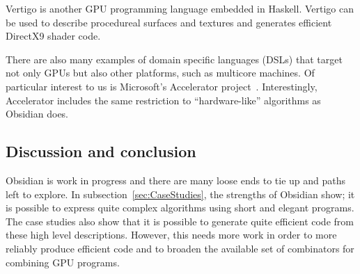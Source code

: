 Vertigo is another GPU programming language embedded in Haskell.
Vertigo can be used to describe procedureal surfaces and textures and generates
efficient DirectX9 shader code. 

There are also many examples of domain specific languages (DSLs)
that target not only GPUs but also other platforms, such as multicore machines.
Of particular interest to us is Microsoft's Accelerator project~. Interestingly, Accelerator includes the same restriction to ``hardware-like'' algorithms as Obsidian does.



 




\subsection{Discussion and conclusion}

Obsidian is work in progress and there are many loose ends to tie up and 
paths left to explore. In subsection~\ref{sec:CaseStudies}, the 
strengths of Obsidian show; it is possible to express quite complex algorithms
using short and elegant programs. The case studies also show that it is possible
to generate quite efficient code from these high level descriptions. However, 
this needs more work in order to more reliably produce efficient code and
to broaden the available set of combinators for combining GPU programs.

